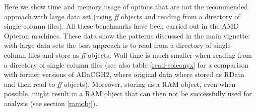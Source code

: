 \documentclass[a4paper,11pt]{article}
\begin{document}
Here we show time and memory usage of options that are not the recommended
approach with large data set (using \textit{ff} objects and reading from a
directory of single-column files). All these benchmarks have been carried
out in the AMD Opteron machines. These data show the patterns discussed in
the main vignette: with large data sets the best approach is to read from
a directory of single-column files and store as \textit{ff} objects. Wall
time is much smaller when reading from a directory of single column files
(see also table \ref{read-coleonyx} for a comparison with former versions
of ADaCGH2, where original data where stored as RData and then read to
\textit{ff} objects). Moreover, storing as a RAM object, even when
possible, might result in a RAM object that can then not be successfully
used for analysis (see section \ref{ramobj}).


\renewcommand{\arraystretch}{1.8}
\end{document}
